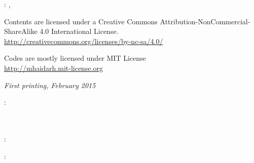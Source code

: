 \thispagestyle{empty}

\hfill

\vfill

\noindent\myName: \textit{\myTitle,} %
\textcopyright\ \myTime

\bigskip

\noindent Contents are licensed under a Creative Commons Attribution-NonCommercial-ShareAlike 4.0 International License.\\
\url{http://creativecommons.org/licenses/by-nc-sa/4.0/}

\medskip

\noindent Codes are mostly licensed under MIT License\\
\url{http://mhaidarh.mit-license.org}

\bigskip

\noindent \textit{First printing, February 2015}

\bigskip

\noindent{}: \\
\mySupervisor \\
\myProfA \\
\myProfB

\medskip

\noindent{}: \\
\myLocation

\medskip

\noindent{}: \\
\myTime

